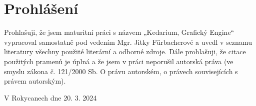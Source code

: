 \section*{Prohlášení}

Prohlašuji, že jsem maturitní práci s názvem „Kedarium, Grafický Engine“ vypracoval samostatně pod vedením Mgr. Jitky Fürbacherové a uvedl v seznamu literatury všechny použité literární a odborné
zdroje. Dále prohlašuji, že citace použitých pramenů je úplná a že jsem v práci neporušil
autorská práva (ve smyslu zákona č. 121/2000 Sb. O právu autorském, o právech souvisejících
s právem autorským).

\vspace{24pt}
\noindent
V Rokycanech dne 20. 3. 2024
\thispagestyle{empty}
\pagebreak
